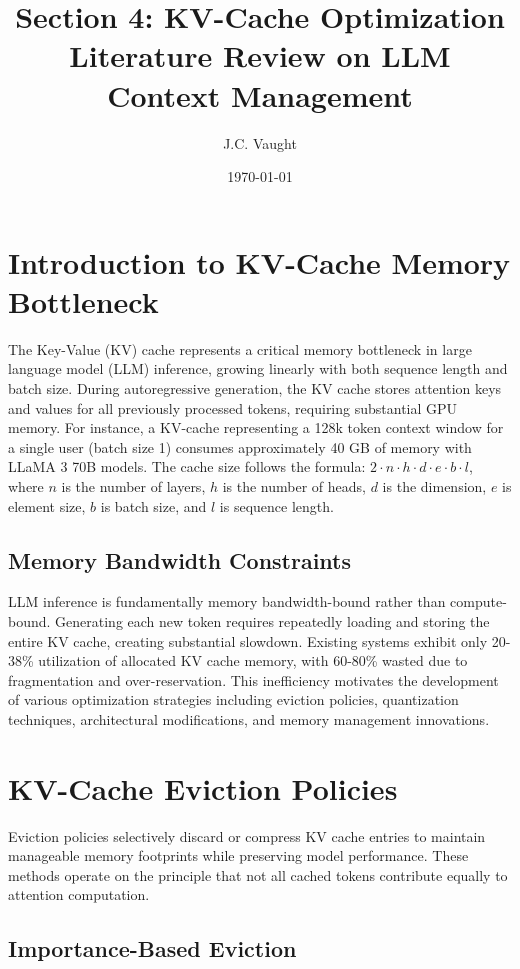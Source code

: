 \documentclass[11pt,letterpaper]{article}
\title{\textbf{\color{garnet}Section 4: KV-Cache Optimization}\\
\large{Literature Review on LLM Context Management}}
\author{J.C. Vaught}
\date{\today}
\begin{document}
\maketitle

\section{Introduction to KV-Cache Memory Bottleneck}

The Key-Value (KV) cache represents a critical memory bottleneck in large language model (LLM) inference, growing linearly with both sequence length and batch size. During autoregressive generation, the KV cache stores attention keys and values for all previously processed tokens, requiring substantial GPU memory. For instance, a KV-cache representing a 128k token context window for a single user (batch size 1) consumes approximately 40 GB of memory with LLaMA 3 70B models. The cache size follows the formula: $2 \cdot n \cdot h \cdot d \cdot e \cdot b \cdot l$, where $n$ is the number of layers, $h$ is the number of heads, $d$ is the dimension, $e$ is element size, $b$ is batch size, and $l$ is sequence length.

\subsection{Memory Bandwidth Constraints}

LLM inference is fundamentally memory bandwidth-bound rather than compute-bound. Generating each new token requires repeatedly loading and storing the entire KV cache, creating substantial slowdown. Existing systems exhibit only 20-38\% utilization of allocated KV cache memory, with 60-80\% wasted due to fragmentation and over-reservation. This inefficiency motivates the development of various optimization strategies including eviction policies, quantization techniques, architectural modifications, and memory management innovations.

\section{KV-Cache Eviction Policies}

Eviction policies selectively discard or compress KV cache entries to maintain manageable memory footprints while preserving model performance. These methods operate on the principle that not all cached tokens contribute equally to attention computation.

\subsection{Importance-Based Eviction}
\end{document}

